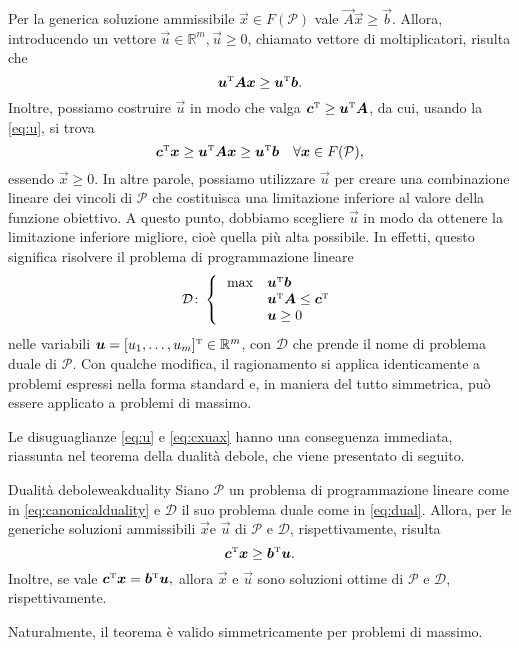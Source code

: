 Per la generica soluzione ammissibile \( \vec{x} \in F(\mathcal{P}) \) vale \( \vec{A}\vec{x} \geq \vec{b} \). Allora,
introducendo un vettore \( \vec{u} \in \mathbb{R}^m, \vec{u} \geq 0 \), chiamato vettore di moltiplicatori, risulta che
\begin{equation}\label{eq:u}
    \bm{u}^{\scriptscriptstyle\mathrm{T}}\bm{A}\bm{x} \geq \bm{u}^{\scriptscriptstyle\mathrm{T}}\bm{b}.
\end{equation}
Inoltre, possiamo costruire \( \vec{u} \) in modo che valga \( \bm{c}^{\scriptscriptstyle\mathrm{T}} \geq \bm{u}^{\scriptscriptstyle\mathrm{T}} \bm{A} \), da cui,
usando la \eqref{eq:u}, si trova
\begin{equation}\label{eq:cxuax}
    \bm{c}^{\scriptscriptstyle\mathrm{T}}\bm{x} \geq \bm{u}^{\scriptscriptstyle\mathrm{T}}\bm{A}\bm{x} \geq \bm{u}^{\scriptscriptstyle\mathrm{T}}\bm{b} \quad \forall \bm{x} \in
    F(\mathcal{P}),
\end{equation}
essendo \( \vec{x} \geq 0 \). In altre parole, possiamo utilizzare \( \vec{u} \) per creare una combinazione lineare dei
vincoli di \( \mathcal{P} \) che costituisca una limitazione inferiore al valore della funzione obiettivo. A questo
punto, dobbiamo scegliere \( \vec{u} \) in modo da ottenere la limitazione inferiore migliore, cioè quella più alta
possibile. In effetti, questo significa risolvere il problema di programmazione lineare
\begin{equation}\label{eq:dual}
    \mathcal{D}\colon\left\{
    \begin{array}{ll}
        \,\max & \bm{u}^{\scriptscriptstyle\mathrm{T}} \bm{b} \\
               & \bm{u}^{\scriptscriptstyle\mathrm{T}}\bm{A} \le \bm{c}^{\scriptscriptstyle\mathrm{T}} \\
             & \bm{u} \ge 0
    \end{array}\right. \\[7pt]
\end{equation}
nelle variabili \( \bm{u} = [u_1 ,\ldots,u_m]^{\scriptscriptstyle\mathrm{T}} \in \mathbb{R}^m \), con \( \mathcal{D} \) che prende il nome di
problema duale di \( \mathcal{P} \).
Con qualche modifica, il ragionamento si applica identicamente a problemi espressi nella forma standard e, in maniera del
tutto simmetrica, può essere applicato a problemi di massimo.

Le disuguaglianze \eqref{eq:u} e \eqref{eq:cxuax} hanno una conseguenza immediata, riassunta nel teorema della dualità
debole, che viene presentato di seguito.

\begin{theorem}{Dualità debole}{weakduality}
    Siano \( \mathcal{P} \) un problema di programmazione lineare come in \eqref{eq:canonicalduality} e \( \mathcal{D}
    \) il suo problema duale come in \eqref{eq:dual}. Allora, per le generiche soluzioni ammissibili \( \vec{x} \text{
    e } \vec{u} \) di \( \mathcal{P} \) e \( \mathcal{D} \), rispettivamente, risulta
    \[
        \bm{c}^{\scriptscriptstyle\mathrm{T}} \bm{x} \geq \bm{b}^{\scriptscriptstyle\mathrm{T}}\bm{u}.
    \]
    Inoltre, se vale
    \(
        \bm{c}^{\scriptscriptstyle\mathrm{T}} \bm{x} = \bm{b}^{\scriptscriptstyle\mathrm{T}}\bm{u},
    \)
    allora \( \vec{x} \) e \( \vec{u} \) sono soluzioni ottime di \( \mathcal{P} \) e \( \mathcal{D} \),
    rispettivamente.
\end{theorem}
\noindent
Naturalmente, il teorema è valido simmetricamente per problemi di massimo.

